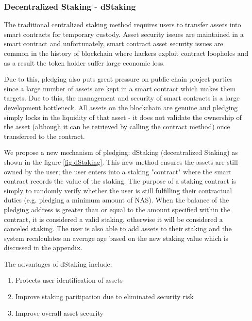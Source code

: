 \subsubsection{Decentralized Staking - dStaking}
The traditional centralized staking method requires users to transfer assets into smart contracts for temporary custody. Asset security issues are maintained in a smart contract and unfortunately, smart contract asset security issues are common in the history of blockchain where hackers exploit contract loopholes and as a result the token holder suffer large economic loss. 

Due to this, pledging also puts great pressure on public chain project parties since a large number of assets are kept in a smart contract which makes them targets. Due to this, the management and security of smart contracts is a large development bottleneck. All assets on the blockchain are genuine and pledging simply locks in the liquidity of that asset - it does not validate the ownership of the asset (although it can be retrieved by calling the contract method) once transferred to the contract.

We propose a new mechanism of pledging: dStaking (decentralized Staking) as shown in the figure \ref{fig:dStaking}. This new method ensures the assets are still owned by the user; the user enters into a staking "contract" where the smart contract records the value of the staking. The purpose of a staking contract is simply to randomly verify whether the user is still fulfilling their contractual duties (e.g. pledging a minimum amount of NAS). When the balance of the pledging address is greater than or equal to the amount specified within the contract, it is considered a valid staking, otherwise it will be considered a canceled staking. The user is also able to add assets to their staking and the system recalculates an average age based on the new staking value which is discussed in the appendix.

The advantages of dStaking include:
\begin{enumerate}[\hspace{2cm}(a)]
    \item Protects user identification of assets
    \item Improve staking paritipation due to eliminated security risk
    \item Improve overall asset security
\end{enumerate}


